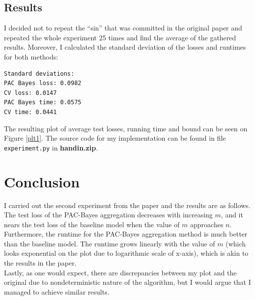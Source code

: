 \documentclass[a4paper]{article}
\begin{document}
\subsection{Results}
I decided not to repeat the ``sin'' that was committed in the original paper and
repeated the whole experiment 25 times and find the average of the gathered
results. Moreover, I calculated the standard deviation of the losses and
runtimes for both methods:

\begin{verbatim}
Standard deviations:
PAC Bayes loss: 0.0982
CV loss: 0.0147
PAC Bayes time: 0.0575
CV time: 0.0441
\end{verbatim}
The resulting plot of average test losses,
running time and bound can be seen on Figure \ref{plt1}. The source code for my
implementation can be found in file \texttt{experiment.py} in
\textbf{handin.zip}.

\section{Conclusion}
I carried out the second experiment from the paper and the results are as
follows.\\
The test loss of the PAC-Bayes aggregation decreases with increasing
$m$, and it nears the test loss of the baseline model when the value of $m$
approaches $n$. \\ Furthermore, the runtime for the PAC-Bayes aggregation method
is much better than the baseline model. The runtime grows linearly with the
value of $m$ (which looks exponential on the plot due to logarithmic scale of
x-axis), which is akin to the results in the paper. \\ Lastly, as one would
expect, there are discrepancies between my plot and the original due to
nondeterministic nature of the algorithm, but I would argue that I managed to
achieve similar results.
\end{document}
